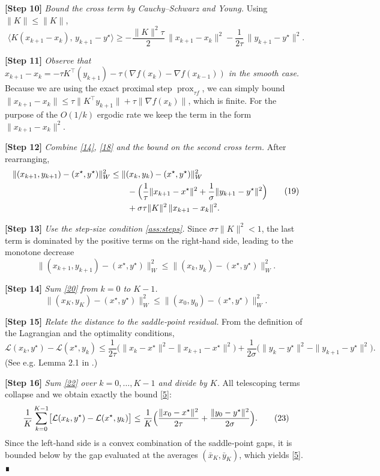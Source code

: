 \documentclass{article}
\newcommand{\prox}{\operatorname{prox}}
\begin{document}
\noindent\textbf{[Step 10]} \emph{Bound the cross term by Cauchy–Schwarz and Young.}
Using $\|K\|\le\|K\|$,
\[
\langle K(x_{k+1}-x_{k}),\,y_{k+1}-y^{\star}\rangle
\ge -\frac{\|K\|^{2}\tau}{2}\,\|x_{k+1}-x_{k}\|^{2}
-\frac{1}{2\tau}\,\|y_{k+1}-y^{\star}\|^{2}.
\tag{18}
\]

\noindent\textbf{[Step 11]} \emph{Observe that $x_{k+1}-x_{k}= -\tau K^{\!\top}(y_{k+1})-\tau(\nabla f(x_{k})-\nabla f(x_{k-1}))$ in the smooth case.}
Because we are using the exact proximal step $\prox_{\tau f}$, we can simply bound $\|x_{k+1}-x_{k}\|\le \tau\|K^{\!\top}y_{k+1}\|+\tau\|\nabla f(x_{k})\|$, which is finite. For the purpose of the $O(1/k)$ ergodic rate we keep the term in the form $\|x_{k+1}-x_{k}\|^{2}$.

\noindent\textbf{[Step 12]} \emph{Combine \eqref{14}, \eqref{18} and the bound on the second cross term.}
After rearranging,
\[
\begin{aligned}
\|(x_{k+1},y_{k+1})-(x^{\star},y^{\star})\|_{W}^{2}
&\le
\|(x_{k},y_{k})-(x^{\star},y^{\star})\|_{W}^{2}\\
&\qquad -\Bigl(\frac{1}{\tau}\|x_{k+1}-x^{\star}\|^{2}
     +\frac{1}{\sigma}\|y_{k+1}-y^{\star}\|^{2}\Bigr)\\
&\qquad +\sigma\tau\|K\|^{2}\,\|x_{k+1}-x_{k}\|^{2}.
\end{aligned}
\tag{19}
\]

\noindent\textbf{[Step 13]} \emph{Use the step‑size condition \eqref{ass:steps}.}
Since $\sigma\tau\|K\|^{2}<1$, the last term is dominated by the positive terms on the right‑hand side, leading to the monotone decrease
\[
\|(x_{k+1},y_{k+1})-(x^{\star},y^{\star})\|_{W}^{2}
\le
\|(x_{k},y_{k})-(x^{\star},y^{\star})\|_{W}^{2}.
\tag{20}
\]

\noindent\textbf{[Step 14]} \emph{Sum \eqref{20} from $k=0$ to $K-1$.}
\[
\|(x_{K},y_{K})-(x^{\star},y^{\star})\|_{W}^{2}
\le
\|(x_{0},y_{0})-(x^{\star},y^{\star})\|_{W}^{2}.
\tag{21}
\]

\noindent\textbf{[Step 15]} \emph{Relate the distance to the saddle‑point residual.}
From the definition of the Lagrangian and the optimality conditions,
\[
\mathcal{L}(x_{k},y^{\star})-\mathcal{L}(x^{\star},y_{k})
\le
\frac{1}{2\tau}\bigl(\|x_{k}-x^{\star}\|^{2}-\|x_{k+1}-x^{\star}\|^{2}\bigr)
+\frac{1}{2\sigma}\bigl(\|y_{k}-y^{\star}\|^{2}-\|y_{k+1}-y^{\star}\|^{2}\bigr).
\tag{22}
\]
(See e.g. Lemma 2.1 in \cite{chambolle2011first}.)  

\noindent\textbf{[Step 16]} \emph{Sum \eqref{22} over $k=0,\dots,K-1$ and divide by $K$.}
All telescoping terms collapse and we obtain exactly the bound \eqref{5}:
\[
\frac{1}{K}\sum_{k=0}^{K-1}\bigl[\mathcal{L}(x_{k},y^{\star})-\mathcal{L}(x^{\star},y_{k})\bigr]
\le
\frac{1}{K}\Bigl(\frac{\|x_{0}-x^{\star}\|^{2}}{2\tau}
+\frac{\|y_{0}-y^{\star}\|^{2}}{2\sigma}\Bigr).
\tag{23}
\]
Since the left‑hand side is a convex combination of the saddle‑point gaps, it is bounded below by the gap evaluated at the averages $(\bar{x}_{K},\bar{y}_{K})$, which yields \eqref{5}. ∎
\end{document}
